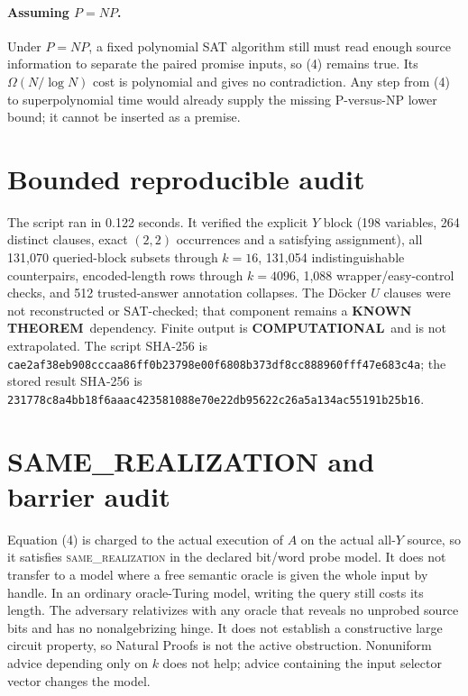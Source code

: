\documentclass[11pt]{article}
\newcommand{\KNOWN}{\textbf{KNOWN THEOREM}}
\newcommand{\COMP}{\textbf{COMPUTATIONAL}}
\begin{document}
\paragraph{Assuming $P=NP$.}
Under $P=NP$, a fixed polynomial SAT algorithm still must read enough source
information to separate the paired promise inputs, so (4) remains true.  Its
$\Omega(N/\log N)$ cost is polynomial and gives no contradiction.  Any step
from (4) to superpolynomial time would already supply the missing P-versus-NP
lower bound; it cannot be inserted as a premise.

\section{Bounded reproducible audit}

The script
 ran in
0.122 seconds.  It verified the explicit $Y$ block (198 variables, 264 distinct
clauses, exact $(2,2)$ occurrences and a satisfying assignment), all 131,070
queried-block subsets through $k=16$, 131,054 indistinguishable counterpairs,
encoded-length rows through $k=4096$, 1,088 wrapper/easy-control checks, and
512 trusted-answer annotation collapses.  The D\"ocker $U$ clauses were not
reconstructed or SAT-checked; that component remains a \KNOWN\ dependency.
Finite output is \COMP\ and is not extrapolated.  The script SHA-256 is
\nolinkurl{cae2af38eb908cccaa86ff0b23798e00f6808b373df8cc888960fff47e683c4a};
the stored result SHA-256 is
\nolinkurl{231778c8a4bb18f6aaac423581088e70e22db95622c26a5a134ac55191b25b16}.

\section{SAME\_REALIZATION and barrier audit}

Equation (4) is charged to the actual execution of $A$ on the actual all-$Y$
source, so it satisfies \textsc{same\_realization} in the declared bit/word
probe model.  It does not transfer to a model where a free semantic oracle is
given the whole input by handle.  In an ordinary oracle-Turing model, writing
the query still costs its length.  The adversary relativizes with any oracle
that reveals no unprobed source bits and has no nonalgebrizing hinge.  It does
not establish a constructive large circuit property, so Natural Proofs is not
the active obstruction.  Nonuniform advice depending only on $k$ does not help;
advice containing the input selector vector changes the model.
\end{document}
